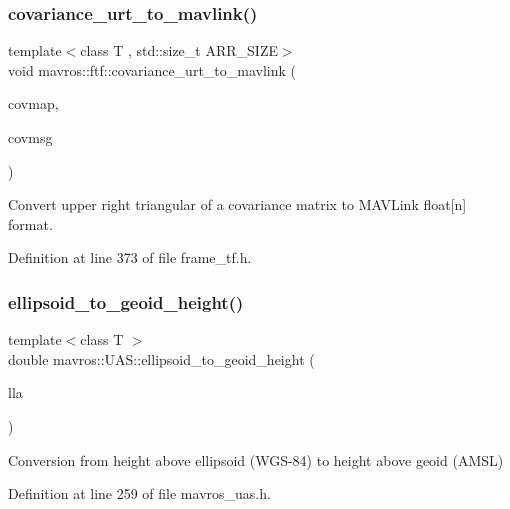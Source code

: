 \subsubsection{\texorpdfstring{covariance\_urt\_to\_mavlink()}{covariance\_urt\_to\_mavlink()}}
{\footnotesize\ttfamily template$<$class T , std\+::size\+\_\+t A\+R\+R\+\_\+\+S\+I\+ZE$>$ \\
void mavros\+::ftf\+::covariance\+\_\+urt\+\_\+to\+\_\+mavlink (\begin{DoxyParamCaption}\item[{const T \&}]{covmap,  }\item[{std\+::array$<$ float, A\+R\+R\+\_\+\+S\+I\+ZE $>$ \&}]{covmsg }\end{DoxyParamCaption})\hspace{0.3cm}{\ttfamily [inline]}}



Convert upper right triangular of a covariance matrix to M\+A\+V\+Link float\mbox{[}n\mbox{]} format. 



Definition at line 373 of file frame\+\_\+tf.\+h.

\mbox{\label{group__nodelib_gaf8185c59b4aa8840717d676d247ea99d}} 
\subsubsection{\texorpdfstring{ellipsoid\_to\_geoid\_height()}{ellipsoid\_to\_geoid\_height()}}
{\footnotesize\ttfamily template$<$class T $>$ \\
double mavros\+::\+U\+A\+S\+::ellipsoid\+\_\+to\+\_\+geoid\+\_\+height (\begin{DoxyParamCaption}\item[{T}]{lla }\end{DoxyParamCaption})\hspace{0.3cm}{\ttfamily [inline]}}



Conversion from height above ellipsoid (W\+G\+S-\/84) to height above geoid (A\+M\+SL) 



Definition at line 259 of file mavros\+\_\+uas.\+h.

\mbox{\label{group__nodelib_ga4f50b74e553d2c2b2a3c4ea02213fd89}} 
